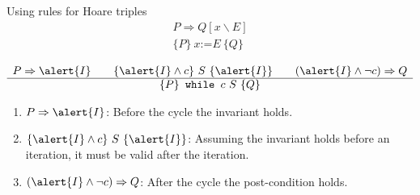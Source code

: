 \documentclass[aspectratio=169]{beamer}
\begin{document}
\begin{frame}{Using rules for Hoare triples}
  $$\begin{array}{c}
    P \Rightarrow Q[x\backslash E]
    \\\hline
    \{P\}~x\texttt{:=}E~\{Q\}
    \end{array}$$

  $$\begin{array}{c}
    P\Rightarrow \alert{I} \qquad \{\alert{I}\land c\} ~S~ \{\alert{I}\} \qquad (\alert{I} \land \lnot c)\Rightarrow Q
    \\\hline
    \{P\} \texttt{ while }c~S~\{Q\}
    \end{array}$$

    \begin{enumerate}
      \item $P \Rightarrow \alert{I}$: Before the cycle the invariant holds.
      \item $\{\alert{I} \land c\}~S~\{ \alert{I} \}$: Assuming the invariant holds before an iteration, it must be valid after the iteration.
      \item $(\alert{I} \land \lnot c) \Rightarrow Q$: After the cycle the post-condition holds.
    \end{enumerate}
\end{frame}

\end{document}

